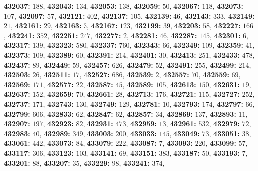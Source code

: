 \textsf{\bfseries 432037:} $188$, \textsf{\bfseries 432043:} $134$, \textsf{\bfseries 432053:} $138$, \textsf{\bfseries 432059:} $50$, \textsf{\bfseries 432067:} $118$, \textsf{\bfseries 432073:} $107$, \textsf{\bfseries 432097:} $57$, \textsf{\bfseries 432121:} $402$, \textsf{\bfseries 432137:} $105$, \textsf{\bfseries 432139:} $46$, \textsf{\bfseries 432143:} $333$, \textsf{\bfseries 432149:} $21$, \textsf{\bfseries 432161:} $29$, \textsf{\bfseries 432163:} $3$, \textsf{\bfseries 432167:} $123$, \textsf{\bfseries 432199:} $39$, \textsf{\bfseries 432203:} $58$, \textsf{\bfseries 432227:} $166$, \textsf{\bfseries 432241:} $352$, \textsf{\bfseries 432251:} $247$, \textsf{\bfseries 432277:} $2$, \textsf{\bfseries 432281:} $46$, \textsf{\bfseries 432287:} $145$, \textsf{\bfseries 432301:} $6$, \textsf{\bfseries 432317:} $139$, \textsf{\bfseries 432323:} $580$, \textsf{\bfseries 432337:} $760$, \textsf{\bfseries 432343:} $66$, \textsf{\bfseries 432349:} $109$, \textsf{\bfseries 432359:} $41$, \textsf{\bfseries 432373:} $109$, \textsf{\bfseries 432389:} $60$, \textsf{\bfseries 432391:} $214$, \textsf{\bfseries 432401:} $30$, \textsf{\bfseries 432413:} $251$, \textsf{\bfseries 432433:} $478$, \textsf{\bfseries 432437:} $89$, \textsf{\bfseries 432449:} $59$, \textsf{\bfseries 432457:} $626$, \textsf{\bfseries 432479:} $52$, \textsf{\bfseries 432491:} $255$, \textsf{\bfseries 432499:} $214$, \textsf{\bfseries 432503:} $26$, \textsf{\bfseries 432511:} $17$, \textsf{\bfseries 432527:} $686$, \textsf{\bfseries 432539:} $2$, \textsf{\bfseries 432557:} $70$, \textsf{\bfseries 432559:} $69$, \textsf{\bfseries 432569:} $171$, \textsf{\bfseries 432577:} $22$, \textsf{\bfseries 432587:} $45$, \textsf{\bfseries 432589:} $105$, \textsf{\bfseries 432613:} $150$, \textsf{\bfseries 432631:} $19$, \textsf{\bfseries 432637:} $152$, \textsf{\bfseries 432659:} $70$, \textsf{\bfseries 432661:} $28$, \textsf{\bfseries 432713:} $176$, \textsf{\bfseries 432721:} $115$, \textsf{\bfseries 432727:} $252$, \textsf{\bfseries 432737:} $171$, \textsf{\bfseries 432743:} $130$, \textsf{\bfseries 432749:} $129$, \textsf{\bfseries 432781:} $10$, \textsf{\bfseries 432793:} $174$, \textsf{\bfseries 432797:} $66$, \textsf{\bfseries 432799:} $606$, \textsf{\bfseries 432833:} $62$, \textsf{\bfseries 432847:} $62$, \textsf{\bfseries 432857:} $34$, \textsf{\bfseries 432869:} $137$, \textsf{\bfseries 432893:} $11$, \textsf{\bfseries 432907:} $197$, \textsf{\bfseries 432923:} $82$, \textsf{\bfseries 432931:} $473$, \textsf{\bfseries 432959:} $13$, \textsf{\bfseries 432961:} $532$, \textsf{\bfseries 432979:} $72$, \textsf{\bfseries 432983:} $40$, \textsf{\bfseries 432989:} $349$, \textsf{\bfseries 433003:} $200$, \textsf{\bfseries 433033:} $145$, \textsf{\bfseries 433049:} $73$, \textsf{\bfseries 433051:} $38$, \textsf{\bfseries 433061:} $442$, \textsf{\bfseries 433073:} $84$, \textsf{\bfseries 433079:} $222$, \textsf{\bfseries 433087:} $7$, \textsf{\bfseries 433093:} $220$, \textsf{\bfseries 433099:} $57$, \textsf{\bfseries 433117:} $306$, \textsf{\bfseries 433123:} $103$, \textsf{\bfseries 433141:} $69$, \textsf{\bfseries 433151:} $383$, \textsf{\bfseries 433187:} $50$, \textsf{\bfseries 433193:} $7$, \textsf{\bfseries 433201:} $88$, \textsf{\bfseries 433207:} $35$, \textsf{\bfseries 433229:} $98$, \textsf{\bfseries 433241:} $374$, 
